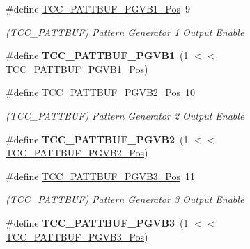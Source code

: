 \begin{DoxyCompactItemize}
\item 
\hypertarget{group___s_a_m_l21___t_c_c_ga1f3e5d82f93b1d0e992ac13786d44b5d}{}\#define \hyperlink{group___s_a_m_l21___t_c_c_ga1f3e5d82f93b1d0e992ac13786d44b5d}{T\+C\+C\+\_\+\+P\+A\+T\+T\+B\+U\+F\+\_\+\+P\+G\+V\+B1\+\_\+\+Pos}~9\label{group___s_a_m_l21___t_c_c_ga1f3e5d82f93b1d0e992ac13786d44b5d}

\begin{DoxyCompactList}\small\item\em (T\+C\+C\+\_\+\+P\+A\+T\+T\+B\+U\+F) Pattern Generator 1 Output Enable \end{DoxyCompactList}\item 
\hypertarget{group___s_a_m_l21___t_c_c_gaf95dca5ccd8b0b75cbf47592fe05162b}{}\#define {\bfseries T\+C\+C\+\_\+\+P\+A\+T\+T\+B\+U\+F\+\_\+\+P\+G\+V\+B1}~(1 $<$$<$ \hyperlink{group___s_a_m_l21___t_c_c_ga1f3e5d82f93b1d0e992ac13786d44b5d}{T\+C\+C\+\_\+\+P\+A\+T\+T\+B\+U\+F\+\_\+\+P\+G\+V\+B1\+\_\+\+Pos})\label{group___s_a_m_l21___t_c_c_gaf95dca5ccd8b0b75cbf47592fe05162b}

\item 
\hypertarget{group___s_a_m_l21___t_c_c_ga564cc5f7b3b6a4a500bcc866e3e5331c}{}\#define \hyperlink{group___s_a_m_l21___t_c_c_ga564cc5f7b3b6a4a500bcc866e3e5331c}{T\+C\+C\+\_\+\+P\+A\+T\+T\+B\+U\+F\+\_\+\+P\+G\+V\+B2\+\_\+\+Pos}~10\label{group___s_a_m_l21___t_c_c_ga564cc5f7b3b6a4a500bcc866e3e5331c}

\begin{DoxyCompactList}\small\item\em (T\+C\+C\+\_\+\+P\+A\+T\+T\+B\+U\+F) Pattern Generator 2 Output Enable \end{DoxyCompactList}\item 
\hypertarget{group___s_a_m_l21___t_c_c_gae3786bf0f46b15e430ab568626e48a47}{}\#define {\bfseries T\+C\+C\+\_\+\+P\+A\+T\+T\+B\+U\+F\+\_\+\+P\+G\+V\+B2}~(1 $<$$<$ \hyperlink{group___s_a_m_l21___t_c_c_ga564cc5f7b3b6a4a500bcc866e3e5331c}{T\+C\+C\+\_\+\+P\+A\+T\+T\+B\+U\+F\+\_\+\+P\+G\+V\+B2\+\_\+\+Pos})\label{group___s_a_m_l21___t_c_c_gae3786bf0f46b15e430ab568626e48a47}

\item 
\hypertarget{group___s_a_m_l21___t_c_c_gae5b79129043133651c2e6dc97ac809f3}{}\#define \hyperlink{group___s_a_m_l21___t_c_c_gae5b79129043133651c2e6dc97ac809f3}{T\+C\+C\+\_\+\+P\+A\+T\+T\+B\+U\+F\+\_\+\+P\+G\+V\+B3\+\_\+\+Pos}~11\label{group___s_a_m_l21___t_c_c_gae5b79129043133651c2e6dc97ac809f3}

\begin{DoxyCompactList}\small\item\em (T\+C\+C\+\_\+\+P\+A\+T\+T\+B\+U\+F) Pattern Generator 3 Output Enable \end{DoxyCompactList}\item 
\hypertarget{group___s_a_m_l21___t_c_c_ga1c032fe4a098a297af0542a1ea271e21}{}\#define {\bfseries T\+C\+C\+\_\+\+P\+A\+T\+T\+B\+U\+F\+\_\+\+P\+G\+V\+B3}~(1 $<$$<$ \hyperlink{group___s_a_m_l21___t_c_c_gae5b79129043133651c2e6dc97ac809f3}{T\+C\+C\+\_\+\+P\+A\+T\+T\+B\+U\+F\+\_\+\+P\+G\+V\+B3\+\_\+\+Pos})\label{group___s_a_m_l21___t_c_c_ga1c032fe4a098a297af0542a1ea271e21}


\end{DoxyCompactItemize}
